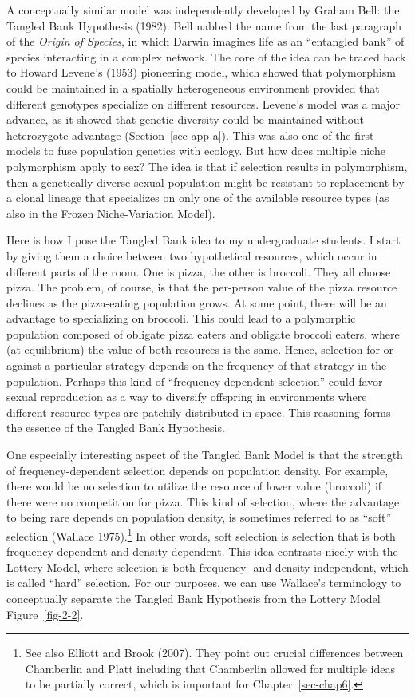 \documentclass[
  letterpaper,
]{book}
\begin{document}
A conceptually similar model was independently developed by Graham Bell:
the Tangled Bank Hypothesis (1982). Bell nabbed the name from the last
paragraph of the \emph{Origin of Species}, in which Darwin imagines life
as an ``entangled bank'' of species interacting in a complex network.
The core of the idea can be traced back to Howard Levene's (1953)
pioneering model, which showed that polymorphism could be maintained in
a spatially heterogeneous environment provided that different genotypes
specialize on different resources. Levene's model was a major advance,
as it showed that genetic diversity could be maintained without
heterozygote advantage (Section~\ref{sec-app-a}). This was also one of
the first models to fuse population genetics with ecology. But how does
multiple niche polymorphism apply to sex? The idea is that if selection
results in polymorphism, then a genetically diverse sexual population
might be resistant to replacement by a clonal lineage that specializes
on only one of the available resource types (as also in the Frozen
Niche-Variation Model).

Here is how I pose the Tangled Bank idea to my undergraduate students. I
start by giving them a choice between two hypothetical resources, which
occur in different parts of the room. One is pizza, the other is
broccoli. They all choose pizza. The problem, of course, is that the
per-person value of the pizza resource declines as the pizza-eating
population grows. At some point, there will be an advantage to
specializing on broccoli. This could lead to a polymorphic population
composed of obligate pizza eaters and obligate broccoli eaters, where
(at equilibrium) the value of both resources is the same. Hence,
selection for or against a particular strategy depends on the frequency
of that strategy in the population. Perhaps this kind of
``frequency-dependent selection'' could favor sexual reproduction as a
way to diversify offspring in environments where different resource
types are patchily distributed in space. This reasoning forms the
essence of the Tangled Bank Hypothesis.

One especially interesting aspect of the Tangled Bank Model is that the
strength of frequency-dependent selection depends on population density.
For example, there would be no selection to utilize the resource of
lower value (broccoli) if there were no competition for pizza. This kind
of selection, where the advantage to being rare depends on population
density, is sometimes referred to as ``soft'' selection (Wallace
1975).\footnote{See also Elliott and Brook (2007). They point out
  crucial differences between Chamberlin and Platt including that
  Chamberlin allowed for multiple ideas to be partially correct, which
  is important for Chapter~\ref{sec-chap6}.} In other words, soft
selection is selection that is both frequency-dependent and
density-dependent. This idea contrasts nicely with the Lottery Model,
where selection is both frequency- and density-independent, which is
called ``hard'' selection. For our purposes, we can use Wallace's
terminology to conceptually separate the Tangled Bank Hypothesis from
the Lottery Model Figure~\ref{fig-2-2}.
\end{document}
